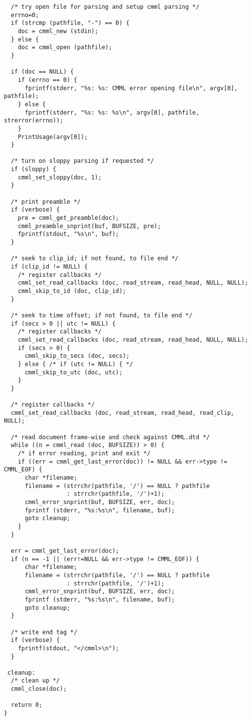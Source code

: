 \begin{verbatim}
  /* try open file for parsing and setup cmml parsing */
  errno=0;
  if (strcmp (pathfile, "-") == 0) {
    doc = cmml_new (stdin);
  } else {
    doc = cmml_open (pathfile);
  }

  if (doc == NULL) {
    if (errno == 0) {
      fprintf(stderr, "%s: %s: CMML error opening file\n", argv[0], pathfile);
    } else {
      fprintf(stderr, "%s: %s: %s\n", argv[0], pathfile, strerror(errno));
    }
    PrintUsage(argv[0]);
  }

  /* turn on sloppy parsing if requested */
  if (sloppy) {
    cmml_set_sloppy(doc, 1);
  }

  /* print preamble */
  if (verbose) {
    pre = cmml_get_preamble(doc);
    cmml_preamble_snprint(buf, BUFSIZE, pre);
    fprintf(stdout, "%s\n", buf);
  }

  /* seek to clip_id; if not found, to file end */
  if (clip_id != NULL) {
    /* register callbacks */
    cmml_set_read_callbacks (doc, read_stream, read_head, NULL, NULL);
    cmml_skip_to_id (doc, clip_id);
  }

  /* seek to time offset; if not found, to file end */
  if (secs > 0 || utc != NULL) {
    /* register callbacks */
    cmml_set_read_callbacks (doc, read_stream, read_head, NULL, NULL);
    if (secs > 0) {
      cmml_skip_to_secs (doc, secs);
    } else { /* if (utc != NULL) { */
      cmml_skip_to_utc (doc, utc);
    }
  }

  /* register callbacks */
  cmml_set_read_callbacks (doc, read_stream, read_head, read_clip, NULL);

  /* read document frame-wise and check against CMML.dtd */
  while ((n = cmml_read (doc, BUFSIZE)) > 0) {
    /* if error reading, print and exit */
    if ((err = cmml_get_last_error(doc)) != NULL && err->type != CMML_EOF) {
      char *filename;
      filename = (strrchr(pathfile, '/') == NULL ? pathfile
                  : strrchr(pathfile, '/')+1);
      cmml_error_snprint(buf, BUFSIZE, err, doc);
      fprintf (stderr, "%s:%s\n", filename, buf);
      goto cleanup;
    }
  }

  err = cmml_get_last_error(doc);
  if (n == -1 || (err!=NULL && err->type != CMML_EOF)) {
      char *filename;
      filename = (strrchr(pathfile, '/') == NULL ? pathfile
                  : strrchr(pathfile, '/')+1);
      cmml_error_snprint(buf, BUFSIZE, err, doc);
      fprintf (stderr, "%s:%s\n", filename, buf);
      goto cleanup;
  }

  /* write end tag */
  if (verbose) {
    fprintf(stdout, "</cmml>\n");
  }
  
 cleanup:
  /* clean up */
  cmml_close(doc);

  return 0;
}
\end{verbatim}
\normalsize
 